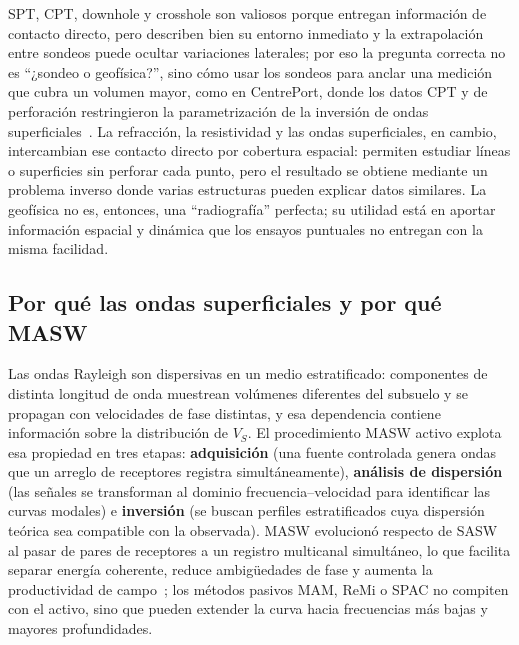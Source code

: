 SPT, CPT, downhole y crosshole son valiosos porque entregan información de contacto
directo, pero describen bien su entorno inmediato y la extrapolación entre sondeos puede
ocultar variaciones laterales; por eso la pregunta correcta no es ``¿sondeo o
geofísica?'', sino cómo usar los sondeos para anclar una medición que cubra un volumen
mayor, como en CentrePort, donde los datos CPT y de perforación restringieron la
parametrización de la inversión de ondas superficiales~\cite{Vantassel2018}. La
refracción, la resistividad y las ondas superficiales, en cambio, intercambian ese
contacto directo por cobertura espacial: permiten estudiar líneas o superficies sin
perforar cada punto, pero el resultado se obtiene mediante un problema inverso donde
varias estructuras pueden explicar datos similares. La geofísica no es, entonces, una
``radiografía'' perfecta; su utilidad está en aportar información espacial y dinámica
que los ensayos puntuales no entregan con la misma facilidad.

\subsection{Por qué las ondas superficiales y por qué MASW}

Las ondas Rayleigh son dispersivas en un medio estratificado: componentes de distinta
longitud de onda muestrean volúmenes diferentes del subsuelo y se propagan con
velocidades de fase distintas, y esa dependencia contiene información sobre la
distribución de $V_S$. El procedimiento MASW activo explota esa propiedad en tres
etapas: \textbf{adquisición} (una fuente controlada genera ondas que un arreglo de
receptores registra simultáneamente), \textbf{análisis de dispersión} (las señales se
transforman al dominio frecuencia--velocidad para identificar las curvas modales) e
\textbf{inversión} (se buscan perfiles estratificados cuya dispersión teórica sea
compatible con la observada). MASW evolucionó respecto de SASW al pasar de pares de
receptores a un registro multicanal simultáneo, lo que facilita separar energía
coherente, reduce ambigüedades de fase y aumenta la productividad de
campo~\cite{Park1999}; los métodos pasivos MAM, ReMi o SPAC no compiten con el activo,
sino que pueden extender la curva hacia frecuencias más bajas y mayores profundidades.

